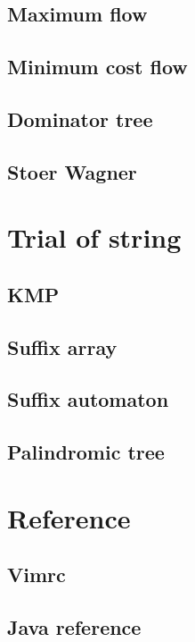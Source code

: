 \documentclass[UTF8,a4paper]{report}
\begin{document}
		\section{Maximum flow}
			
		\section{Minimum cost flow}
			
		\section{Dominator tree}
			
		\section{Stoer Wagner}
			
	\chapter{Trial of string}
		\section{KMP}
			
		\section{Suffix array}
			
		\section{Suffix automaton}
			
		\section{Palindromic tree}
			
	\chapter{Reference}
		\section{Vimrc}
			
		\section{Java reference}
			
\end{document}
